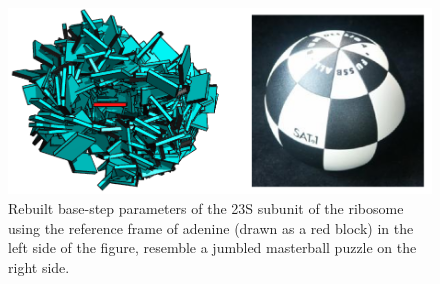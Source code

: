 \begin{figure}
\centering
\includegraphics[angle=0, scale=0.4]{Chapter2/masterball2.png}
\caption{Rebuilt  base-step  parameters  of  the 23S  subunit  of  the
  ribosome using the reference frame of adenine (drawn as a red block)
  in the left side of the figure, resemble a jumbled masterball puzzle
  on the right side.}
\label{fig:masterball}
\end{figure}






